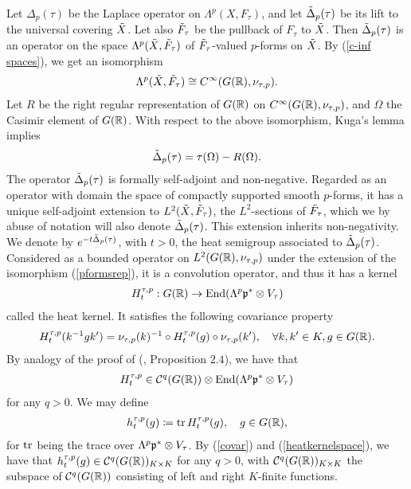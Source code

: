 Let $\Delta_p(\tau)$ be the Laplace operator on $\Lambda^p(X,F_\tau)$, and let $\Tilde{\Delta}_p(\tau)$ be its lift to the universal covering $\Tilde{X}$. Let also $\Tilde{F}_\tau$ be the pullback of $F_\tau$ to $\Tilde{X}$. Then $\Tilde{\Delta}_p(\tau)$ is an operator on the space $\Lambda^p(\Tilde{X},\Tilde{F}_\tau)$ of $\Tilde{F}_\tau$-valued $p$-forms on $\Tilde{X}$. By (\ref{c-inf spaces}), we get an isomorphism
\begin{align}\label{pformsrep}
    \Lambda^p(\Tilde{X},\Tilde{F}_\tau)\cong C^\infty(G(\mathbb{R}),\nu_{\tau,p}).
\end{align}
Let $R$ be the right regular representation of $G(\mathbb{R})$ on $C^\infty(G(\mathbb{R}),\nu_{\tau,p})$, and $\Omega$ the Casimir element of $G(\mathbb{R})$. With respect to the above isomorphism, Kuga's lemma implies
\begin{align}\label{casimirglobal}
    \Tilde{\Delta}_p(\tau)=\tau(\Omega)-R(\Omega).
\end{align}
The operator $\Tilde{\Delta}_p(\tau)$ is formally self-adjoint and non-negative. Regarded as an operator with domain the space of compactly supported smooth $p$-forms, it has a unique self-adjoint extension to $L^2(\Tilde{X},\Tilde{F}_\tau)$, the $L^2$-sections of $\Tilde{F}_\tau$, which we by abuse of notation will also denote $\Tilde{\Delta}_p(\tau)$. This extension inherits non-negativity. We denote by $e^{-t\Tilde{\Delta}_p(\tau)}$, with $t>0$, the heat semigroup associated to $\Tilde{\Delta}_p(\tau)$. Considered as a bounded operator on $L^2(G(\mathbb{R}),\nu_{\tau,p})$ under the extension of the isomorphism (\ref{pformsrep}), it is a convolution operator, and thus it has a kernel
\begin{align*}
    H_t^{\tau,p}:G(\mathbb{R})\to \operatorname{End}(\Lambda^p\mathfrak{p}^*\otimes V_\tau)
\end{align*}
called the heat kernel. It satisfies the following covariance property
\begin{align}\label{covar}
    H_t^{\tau,p}(k^{-1}gk')=\nu_{\tau,p}(k)^{-1}\circ H_t^{\tau,p}(g)\circ \nu_{\tau,p}(k'), \quad \forall k,k'\in K, g\in G(\mathbb{R}).
\end{align}
By analogy of the proof of (\cite{BM}, Proposition $2.4$), we have that 
\begin{align}\label{heatkernelspace}
    H_t^{\tau,p}\in \mathcal{C}^q(G(\mathbb{R}))\otimes \operatorname{End}(\Lambda^p\mathfrak{p}^*\otimes V_\tau)
\end{align} 
for any $q>0$. We may define
\begin{align}\label{trheat}
    h_t^{\tau,p}(g)\coloneqq \operatorname{tr} H_t^{\tau,p}(g), \quad g\in G(\mathbb{R}),
\end{align}
for $\operatorname{tr}$ being the trace over $\Lambda^p\mathfrak{p}^*\otimes V_\tau$. By (\ref{covar}) and (\ref{heatkernelspace}), we have that $h_t^{\tau,p}(g)\in \mathcal{C}^q(G(\mathbb{R}))_{K\times K}$ for any $q>0$, with $\mathcal{C}^q(G(\mathbb{R}))_{K\times K}$ the subspace of $\mathcal{C}^q(G(\mathbb{R}))$ consisting of left and right $K$-finite functions. 





